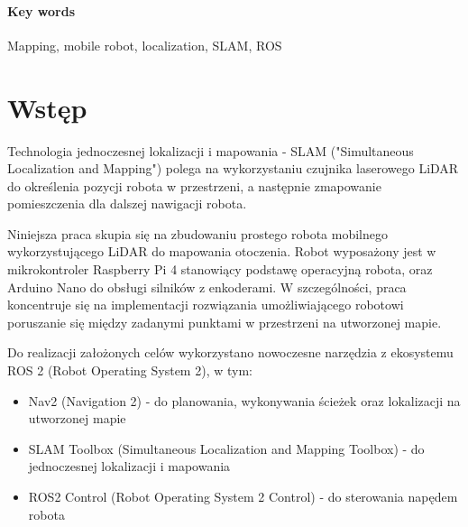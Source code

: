 \documentclass[a4paper,twoside,12pt]{book}
\newcounter{stronyPozaNumeracja}
\begin{document}
\subsubsection*{Key words}  
\begin{otherlanguage}{british}
Mapping, mobile robot, localization, SLAM, ROS
\end{otherlanguage}




\tableofcontents

\setcounter{stronyPozaNumeracja}{\value{page}}
\mainmatter
\pagestyle{empty}

\cleardoublepage

\pagestyle{NumeryStronNazwyRozdzialow}


\chapter{Wstęp}
\label{ch:wstep}
Technologia jednoczesnej lokalizacji i mapowania - SLAM ("Simultaneous Localization and Mapping") polega na wykorzystaniu czujnika laserowego LiDAR do określenia pozycji robota w przestrzeni, a następnie zmapowanie pomieszczenia dla dalszej nawigacji robota.  

Niniejsza praca skupia się na zbudowaniu prostego robota mobilnego wykorzystującego LiDAR do mapowania otoczenia. Robot wyposażony jest w mikrokontroler Raspberry Pi 4 stanowiący podstawę operacyjną robota, oraz Arduino Nano do obsługi silników z enkoderami. W szczególności, praca koncentruje się na implementacji rozwiązania umożliwiającego robotowi poruszanie się między zadanymi punktami w przestrzeni na utworzonej mapie.

Do realizacji założonych celów wykorzystano nowoczesne narzędzia z ekosystemu ROS 2 (Robot Operating System 2), w tym:
\begin{itemize}
\item Nav2 (Navigation 2) - do planowania, wykonywania ścieżek oraz lokalizacji na utworzonej mapie
\item SLAM Toolbox (Simultaneous Localization and Mapping Toolbox) - do jednoczesnej lokalizacji i mapowania
\item ROS2 Control (Robot Operating System 2 Control) - do sterowania napędem robota
\end{itemize}
\end{document}
